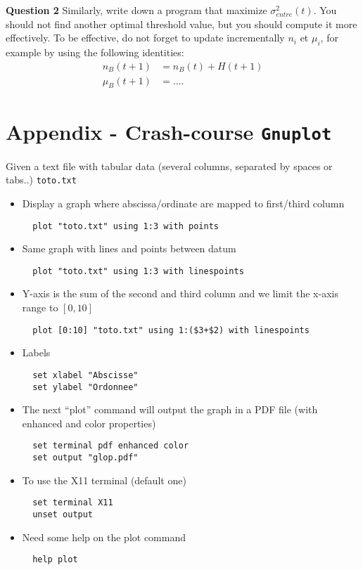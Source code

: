 \documentclass[a4paper, 11pt]{article}
\begin{document}
{\bf Question 2} Similarly, write down a program that maximize $\sigma^2_{entre}(t)$. You should not find another optimal threshold value, but you should compute it more effectively. To be effective, do not forget to update incrementally  $n_i$ et $\mu_i$, for example by using the following identities:
\begin{align}
  n_B(t+1) & = n_B(t) + H(t+1)\\
  \mu_B(t+1)& = ....
\end{align}


\newpage
\section*{\bf Appendix - \rm Crash-course \texttt{Gnuplot}}

Given a text file with tabular data (several columns, separated by spaces or tabs..) \texttt{toto.txt}
\begin{itemize}
\item Display a graph where abscissa/ordinate  are mapped to first/third column  
\begin{verbatim}
  plot "toto.txt" using 1:3 with points
\end{verbatim}

\item Same graph with lines and points between datum
\begin{verbatim}
  plot "toto.txt" using 1:3 with linespoints
\end{verbatim}

\item Y-axis is the sum of the second and third column and we limit the x-axis range to $[0,10]$
\begin{verbatim}
  plot [0:10] "toto.txt" using 1:($3+$2) with linespoints
\end{verbatim}

\item Labels
\begin{verbatim}
  set xlabel "Abscisse"
  set ylabel "Ordonnee"
\end{verbatim}

\item The next ``plot'' command will output the graph in a PDF file (with enhanced and color properties)
\begin{verbatim}
  set terminal pdf enhanced color
  set output "glop.pdf"
\end{verbatim}

\item To use the X11 terminal (default one)
\begin{verbatim}
  set terminal X11
  unset output
\end{verbatim}

\item Need some help on the plot command
\begin{verbatim}
  help plot
\end{verbatim}

\end{itemize}
\end{document}
